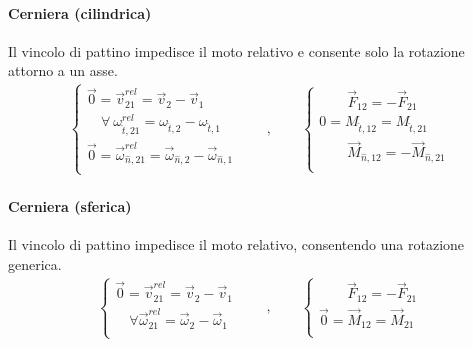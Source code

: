 \documentclass[letterpaper,10pt,italian]{jupyterBook}
\begin{document}
\paragraph{Cerniera (cilindrica)}
\label{\detokenize{ch/mechanics/actions-examples:cerniera-cilindrica}}\label{\detokenize{ch/mechanics/actions-examples:physics-hs-mechanics-actions-contact-ideal-constraints-hinge-cylindrical}}
\sphinxAtStartPar
Il vincolo di pattino impedisce il moto relativo e consente solo la rotazione attorno a un asse.
\begin{equation*}
\begin{split}
\begin{cases}
  \vec{0} = \vec{v}^{rel}_{21}     = \vec{v}_{2}     - \vec{v}_{1} \\
  \quad \forall \ \omega^{rel}_{\hat{t},21} = \omega_{\hat{t},2} - \omega_{\hat{t},1} \\
  \vec{0} = \vec{\omega}^{rel}_{\hat{n},21} = \vec{\omega}_{\hat{n},2} - \vec{\omega}_{\hat{n},1} \\
\end{cases}
\qquad , \qquad
\begin{cases}
  \qquad \vec{F}_{12} = - \vec{F}_{21} \\
  0 =  M_{\hat{t},12} = M_{\hat{t},21} \\
  \qquad \vec{M}_{\hat{n},12} = - \vec{M}_{\hat{n},21} \\
\end{cases}
\end{split}
\end{equation*}

\paragraph{Cerniera (sferica)}
\label{\detokenize{ch/mechanics/actions-examples:cerniera-sferica}}\label{\detokenize{ch/mechanics/actions-examples:physics-hs-mechanics-actions-contact-ideal-constraints-hinge-spherical}}
\sphinxAtStartPar
Il vincolo di pattino impedisce il moto relativo, consentendo una rotazione generica.
\begin{equation*}
\begin{split}
\begin{cases}
  \vec{0} = \vec{v}^{rel}_{21}     = \vec{v}_{2}     - \vec{v}_{1} \\
  \quad \forall \vec{\omega}^{rel}_{21} = \vec{\omega}_{2} - \vec{\omega}_{1} \\
\end{cases}
\qquad , \qquad
\begin{cases}
  \qquad \vec{F}_{12} = - \vec{F}_{21} \\
  \vec{0} =  \vec{M}_{12} = \vec{M}_{21} \\
\end{cases}
\end{split}
\end{equation*}
\end{document}
